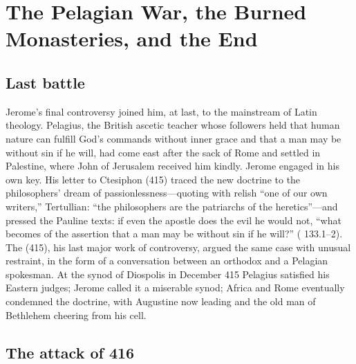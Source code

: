 \section{The Pelagian War, the Burned Monasteries, and the End}

\subsection{Last battle}

Jerome's final controversy joined him, at last, to the mainstream of Latin
theology. Pelagius, the British ascetic teacher whose followers held that
human nature can fulfill God's commands without inner grace and that a man
may be without sin if he will, had come east after the sack of Rome and
settled in Palestine, where John of Jerusalem received him kindly. Jerome
engaged in his own key. His letter to Ctesiphon (415) traced the new doctrine
to the philosophers' dream of passionlessness---quoting with relish ``one of
our own writers,'' Tertullian: ``the philosophers are the patriarchs of the
heretics''---and pressed the Pauline texts: if even the apostle does the evil
he would not, ``what becomes of the assertion that a man may be without sin
if he will?'' ( 133.1--2). The  (415), his last major work of controversy, argued the same case
with unusual restraint, in the form of a conversation between an orthodox
and a Pelagian spokesman. At the synod of Diospolis in December 415 Pelagius
satisfied his Eastern judges; Jerome called it a miserable synod; Africa and
Rome eventually condemned the doctrine, with Augustine now leading and the
old man of Bethlehem cheering from his cell.

\subsection{The attack of 416}

